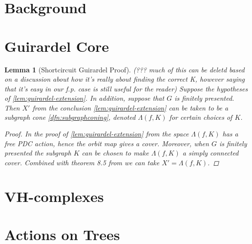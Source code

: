 \documentclass[12pt,parskip=full]{report}
\theoremstyle{plain}
\newtheorem{lem}[thm]{Lemma}
\theoremstyle{definition}
\begin{document}
\section{Background}

\section{Guirardel Core}

\begin{lem}
    [Shortcircuit Guirardel Proof] 
    \label{lem:shortcircuit} (??? much of this can be deletd based on a discussion about how it's really about finding the correct K, however saying that it's easy in our f.p. case is still useful for the reader) Suppose the hypotheses of \ref{lem:guirardel-extension}. In addition, suppose that $G$ is finitely presented. Then \(X'\) from the conclusion \ref{lem:guirardel-extension} can be taken to be a subgraph cone \ref{dfn:subgraphconing}, denoted \(\Lambda(f,K)\) for certain choices of \(K\).
    \begin{proof}
        In the proof of \ref{lem:guirardel-extension} from \cite{guirardelcorepaper} the space \(\Lambda(f,K)\) has a free PDC action, hence the orbit map gives a cover. Moreover, when \(G\) is finitely presented the subgraph \(K\) can be chosen to make \(\Lambda(f,K)\) a simply connected cover. Combined with theorem 8.5 from \cite{guirardelcorepaper} we can take \(X' = \Lambda(f,K)\).
    \end{proof}

\end{lem}

\section{VH-complexes}



\section{Actions on Trees}



\end{document}
